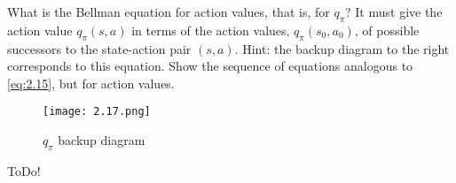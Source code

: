 
\begin{exercise}[Exercise 3.17]

What is the Bellman equation for action values, that is, for $q_\pi$?
It must give the action value $q_\pi(s, a)$ in terms of the action values, $q_\pi(s_0, a_0)$, of possible successors to the state-action pair $(s, a)$.
Hint:
the backup diagram to the right corresponds to this equation.
Show the sequence of equations analogous to \eqref{eq:2.15}, but for action values.

\begin{figure}[H]
    \centering
    \texttt{[image: 2.17.png]}
    \caption{$q_\pi$ backup diagram}
    \label{fig:2.17}
\end{figure}

\end{exercise}


\begin{solution}

ToDo!

\end{solution}

